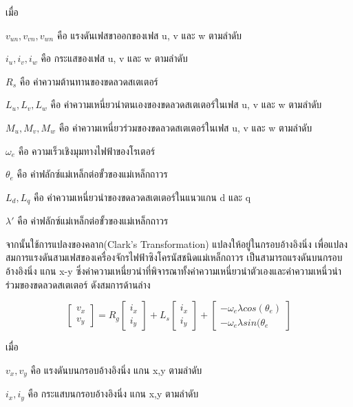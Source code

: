 \documentclass[11pt,a4paper]{article}
\begin{document}
เมื่อ

$v_{un},v_{vn},v_{wn}$ คือ แรงดันเฟสขาออกของเฟส u, v และ w ตามลำดับ

$i_{u},i_{v},i_{w}$      คือ กระแสของเฟส u, v และ w ตามลำดับ

$R_{s}$               คือ ค่าความต้านทานของขดลวดสเตเตอร์

$L_{u},L_{v},L_{w}$        คือ ค่าความเหนี่ยวนำตนเองของขดลวดสเตเตอร์ในเฟส u, v และ w ตามลำดับ

$M_{u},M_{v},M_{w}$       คือ ค่าความเหนี่ยวร่วมของขดลวดสเตเตอร์ในเฟส u, v และ w ตามลำดับ

$\omega_{e}$                    คือ ความเร็วเชิงมุมทางไฟฟ้าของโรเตอร์

$\theta_{e}$               คือ ค่าฟลักซ์แม่เหล็กต่อขั้วของแม่เหล็กถาวร

$L_{d},L_{q}$                      คือ ค่าความเหนี่ยวนำของขดลวดสเตเตอร์ในแนวแกน d และ q

$\lambda'$ คือ ค่าฟลักซ์แม่เหล็กต่อขั้วของแม่เหล็กถาวร

จากนั้นใช้การแปลงของคลาก(Clark’s Transformation) \cite{sswch3} \cite{vectorIEEE} แปลงให้อยู่ในกรอบอ้างอิงนิ่ง เพื่อแปลงสมการแรงดันสามเฟสของเครื่องจักรไฟฟ้าซิงโครนัสชนิดแม่เหล็กถาวร เป็นสามารถแรงดันบนกรอบอ้างอิงนิ่ง แกน x-y ซึ่งค่าความเหนี่ยวนำที่พิจารณาทั้งค่าความเหนี่ยวนำตัวเองและค่าความเหนี่วนำร่วมของขดลวดสเตเตอร์ ดังสมการด้านล่าง

\begin{equation}
    \begin{bmatrix}
        v_{x} \\v_{y}
    \end{bmatrix} = R_{g}
    \begin{bmatrix}
        i_{x} \\i_{y}
    \end{bmatrix} + L_{s}
    \begin{bmatrix}
        i_{x} \\i_{y}
    \end{bmatrix}+
    \begin{bmatrix}
        -\omega_{e} \lambda cos(\theta_{e}) \\-\omega_{e} \lambda sin(\theta_{e}
    \end{bmatrix}
\end{equation}

เมื่อ

$v_{x},v_{y}$ คือ แรงดันบนกรอบอ้างอิงนิ่ง แกน x,y ตามลำดับ

$i_{x},i_{y}$      คือ กระแสบนกรอบอ้างอิงนิ่ง แกน x,y ตามลำดับ
\end{document}
